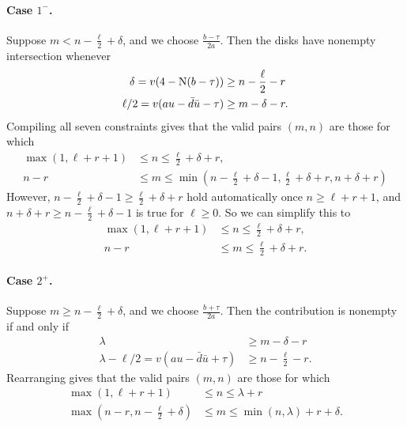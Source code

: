 \paragraph{Case $1^-$.}
Suppose $m < n - \frac{\ell}{2} + \delta$, and we choose $\frac{b-\tau}{2a}$.
Then the disks have nonempty intersection whenever
\begin{align*}
  \delta = v(4-\operatorname{N}(b-\tau)) &\geq n - \frac{\ell}{2} - r \\
  \ell/2 = v(au-\bar d \bar u - \tau) & \geq m - \delta - r.
\end{align*}
Compiling all seven constraints gives that the valid pairs $(m,n)$ are those for which
\begin{align*}
  \max(1, \ell+r+1) &\leq n \leq \frac{\ell}{2}+\delta+r, \\
  n-r &\leq m \leq \min\left( n - \frac{\ell}{2}+\delta - 1,
    \frac{\ell}{2} + \delta + r, n + \delta + r \right)
\end{align*}
However, $n - \frac{\ell}{2}+\delta - 1 \ge \frac{\ell}{2} + \delta + r$
hold automatically once $n \ge \ell + r + 1$,
and $n + \delta + r \ge n - \frac{\ell}{2}+\delta - 1$
is true for $\ell \ge 0$.
So we can simplify this to
\begin{equation}
  \begin{aligned}
    \max(1, \ell+r+1) &\leq n \leq \frac{\ell}{2}+\delta+r, \\
    n-r &\leq m \leq \frac{\ell}{2} + \delta + r.
  \end{aligned}
  \label{eq:even_case1_minus}
\end{equation}

\paragraph{Case $2^+$.}
Suppose $m \ge n - \frac{\ell}{2} + \delta$, and we choose $\frac{b+\tau}{2a}$.
Then the contribution is nonempty if and only if
\begin{align*}
  \lambda &\geq m - \delta - r \\
  \lambda - \ell/2 = v(au-\bar d \bar u + \tau) & \geq n - \frac{\ell}{2} - r.
\end{align*}
Rearranging gives that the valid pairs $(m,n)$ are those for which
\begin{equation}
  \begin{aligned}
    \max(1, \ell+r+1) &\leq n \leq \lambda + r \\
    \max\left( n-r, n - \frac{\ell}{2} + \delta \right) &\leq m \leq \min(n, \lambda) + r + \delta.
  \end{aligned}
  \label{eq:even_case2_plus}
\end{equation}


